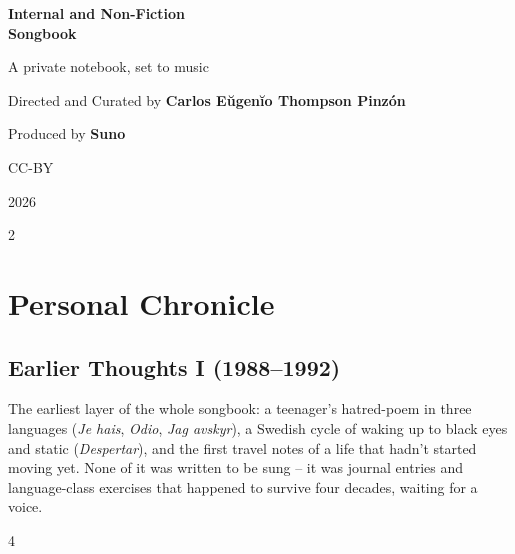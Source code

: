 \documentclass[a4paper,landscape]{memoir}
\begin{document}
\frontmatter
{}

\begin{titlingpage}
\centering
\vspace*{\fill}
{\LARGE\bfseries Internal and Non-Fiction\\\Huge Songbook\par}
\bigskip
{\large A private notebook, set to music\par}
\vspace*{\fill}
{\normalsize Directed and Curated by \bfseries Carlos Eŭgenĭo Thompson Pinzón\par}
{\normalsize Produced by \bfseries Suno\par}
\bigskip
{\normalsize CC-BY\par}
{\normalsize 2026\par}
\vspace*{\fill}
\end{titlingpage}

\clearpage\begin{multicols*}{2}
\tableofcontents*
\end{multicols*}
\mainmatter
\renewcommand\chaptername{Album~}

\part{Personal Chronicle}

\chapter{Earlier Thoughts I (1988–1992)}
The earliest layer of the whole songbook: a teenager's hatred-poem in three languages (\emph{Je hais}, \emph{Odio}, \emph{Jag avskyr}), a Swedish cycle of waking up to black eyes and static (\emph{Despertar}), and the first travel notes of a life that hadn't started moving yet. None of it was written to be sung -- it was journal entries and language-class exercises that happened to survive four decades, waiting for a voice.
\clearpage\begin{multicols*}{4}



















\end{multicols*}
\end{document}
